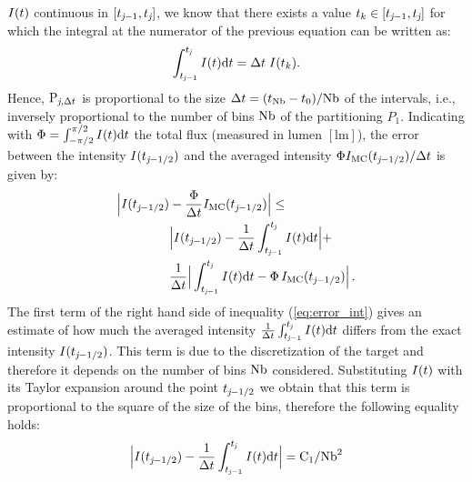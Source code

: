 $I(t)$ continuous in $[t_{\textit{j}-1}, t_{\textit{j}}]$, we know that there exists a value $t_{k}\in[t_{\textit{j}-1}, t_{\textit{j}}]$ for which the integral at the numerator of the previous equation can be written as: \begin{equation}
\int_{t_{\textit{j}-1}}^{t_{\textit{j}}} I(t) \textrm{d}t = \Delta t\;I(t_{k}).
\end{equation}
Hence, $\textrm{P}_{\textit{j}, \Delta t}$ is proportional to the size $\Delta t= (t_{\textrm{Nb}}-t_{0})/{\textrm{Nb}}$
of the intervals, i.e., inversely proportional to the number of bins $\textrm{Nb}$ of the partitioning $P_1$.
Indicating with $\Phi = \int_{-\pi/2}^{\pi/2}I(t) \textrm{d}t$ the total flux (measured in lumen $[\textrm{lm}]$),
the error between the intensity $I(t_{\textit{j}-1/2})$
 and the averaged  intensity $\Phi I_{\textrm{MC}}(t_{\textit{j}-1/2})/\Delta t$ is given by:
\begin{equation}\label{eq:error_int}
\begin{aligned}
\Big|I(t_{\textit{j}-1/2})&-\frac{\Phi}
{\Delta t}I_{\textrm{MC}}(t_{\textit{j}-1/2})\Big| \leq\\
 &\Big|I(t_{\textit{j}-1/2})-\frac{1}{\Delta t}\int_{t_{\textit{j}-1}}^{t_{\textit{j}}} I(t)\textrm{d}t\Big|+\\
&\frac{1}{\Delta t}\Big|\int_{t_{\textit{j}-1}}^{t_{\textit{j}}} I(t)\textrm{d}t-
\Phi\, I_{\textrm{MC}}(t_{\textit{j}-1/2})\Big| \,.
\end{aligned}
\end{equation}
\indent The first term of the right hand side of inequality (\ref{eq:error_int}) gives an estimate of how much the averaged intensity
 $\frac{1}{\Delta t}\int_{t_{\textit{j}-1}}^{t_{\textit{j}}} I(t)\textrm{d}t$ differs from the exact intensity $I(t_{\textit{j}-1/2})$.
This term is due to the discretization of the target and therefore it depends on the number of bins $\textrm{Nb}$ considered.
  Substituting $I(t)$ with its Taylor expansion around the point $t_{\textit{j}-1/2}$ we obtain that this term is proportional to the square of the size of the bins, therefore the following equality holds:
\begin{equation}\Big|I(t_{\textit{j}-1/2})-\frac{1}{\Delta t}\int_{t_{\textit{j}-1}}^{t_{\textit{j}}} I(t)\textrm{d}t\Big| = \textrm{C}_1/\textrm{Nb}^2\end{equation}

